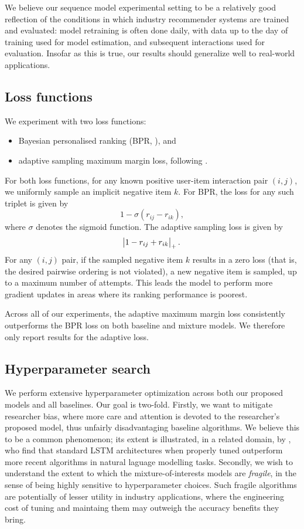 \documentclass[sigconf]{acmart}
\begin{document}
We believe our sequence model experimental setting to be a relatively good reflection of the conditions in which industry recommender systems are trained and evaluated: model retraining is often done daily, with data up to the day of training used for model estimation, and subsequent interactions used for evaluation. Insofar as this is true, our results should generalize well to real-world applications.

\subsection{Loss functions}
We experiment with two loss functions:
\begin{itemize}
\item Bayesian personalised ranking (BPR, \citet{rendle2009bpr}), and
\item adaptive sampling maximum margin loss, following \citet{weston2011wsabie}.
\end{itemize}
For both loss functions, for any known positive user-item interaction pair $(i, j)$, we uniformly sample an implicit negative item $k$. For BPR, the loss for any such triplet is given by
\begin{equation}
1 - \sigma\left(r_{ij} - r_{ik}\right),
\end{equation}
where $\sigma$ denotes the sigmoid function.
The adaptive sampling loss is given by
\begin{equation}
\abs{1 - r_{ij} + r_{ik}}_{+}.
\end{equation}
For any $(i, j)$ pair, if the sampled negative item $k$ results in a zero loss (that is, the desired pairwise ordering is not violated), a new negative item is sampled, up to a maximum number of attempts. This leads the model to perform more gradient updates in areas where its ranking performance is poorest.

Across all of our experiments, the adaptive maximum margin loss consistently outperforms the BPR loss on both baseline and mixture models. We therefore only report results for the adaptive loss.

\subsection{Hyperparameter search}

We perform extensive hyperparameter optimization across both our proposed models and all baselines. Our goal is two-fold. Firstly, we want to mitigate researcher bias, where more care and attention is devoted to the researcher's proposed model, thus unfairly disadvantaging baseline algorithms. We believe this to be a common phenomenon; its extent is illustrated, in a related domain, by \cite{melis2017state}, who find that standard LSTM architectures when properly tuned outperform more recent algorithms in natural laguage modelling tasks. Secondly, we wish to understand the extent to which the mixture-of-interests models are \emph{fragile}, in the sense of being highly sensitive to hyperparameter choices. Such fragile algorithms are potentially of lesser utility in industry applications, where the engineering cost of tuning and maintaing them may outweigh the accuracy benefits they bring.
\end{document}
